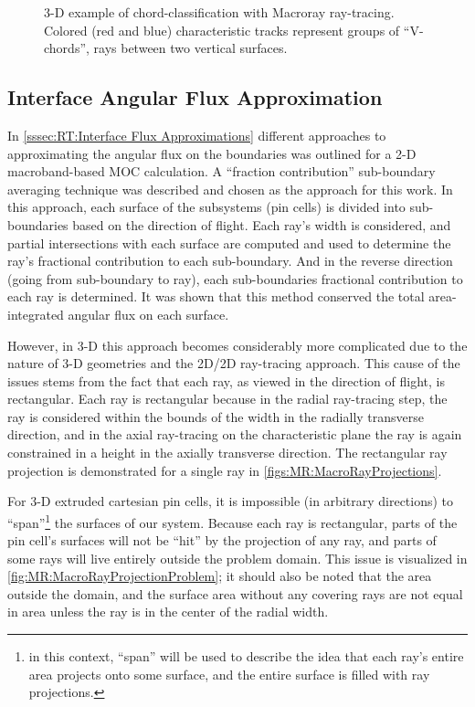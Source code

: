 {{{      \begin{figure}[h]
        \centering
        \def\svgwidth{0.45\linewidth}
        
        \caption{3-D example of chord-classification with Macroray ray-tracing. Colored (red and blue) characteristic tracks represent groups of ``V-chords'', rays between two vertical surfaces.}
        \label{fig:RT:Chord-Classification Macroray}
      \end{figure}
    }

    \subsection{Interface Angular Flux Approximation}{\label{ssec:MR:Interface Angular Flux Approximation}
      In \cref{sssec:RT:Interface Flux Approximations} different approaches to approximating the angular flux on the boundaries was outlined for a 2-D macroband-based \ac{MOC} calculation.
      A ``fraction contribution'' sub-boundary averaging technique was described and chosen as the approach for this work.
      In this approach, each surface of the subsystems (pin cells) is divided into sub-boundaries based on the direction of flight.
      Each ray's width is considered, and partial intersections with each surface are computed and used to determine the ray's fractional contribution to each sub-boundary.
      And in the reverse direction (going from sub-boundary to ray), each sub-boundaries fractional contribution to each ray is determined.
      It was shown that this method conserved the total area-integrated angular flux on each surface.

      However, in 3-D this approach becomes considerably more complicated due to the nature of 3-D geometries and the 2D/2D ray-tracing approach.
      This cause of the issues stems from the fact that each ray, as viewed in the direction of flight, is rectangular.
      Each ray is rectangular because in the radial ray-tracing step, the ray is considered within the bounds of the width in the radially transverse direction, and in the axial ray-tracing on the characteristic plane the ray is again constrained in a height in the axially transverse direction.
      The rectangular ray projection is demonstrated for a single ray in \cref{figs:MR:MacroRayProjections}.

      For 3-D extruded cartesian pin cells, it is impossible (in arbitrary directions) to ``span''\footnote{in this context, ``span'' will be used to describe the idea that each ray's entire area projects onto some surface, and the entire surface is filled with ray projections.} the surfaces of our system.
      Because each ray is rectangular, parts of the pin cell's surfaces will not be ``hit'' by the projection of any ray, and parts of some rays will live entirely outside the problem domain.
      This issue is visualized in \cref{fig:MR:MacroRayProjectionProblem}; it should also be noted that the area outside the domain, and the surface area without any covering rays are not equal in area unless the ray is in the center of the radial width.

}}}
